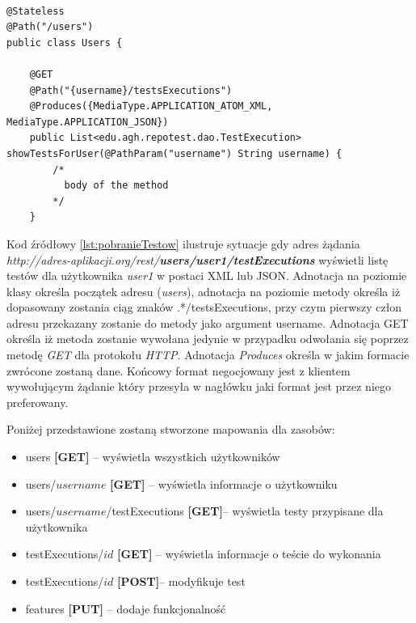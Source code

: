   
 \begin{lstlisting}[caption=Pobranie testów do wykonania dla użytkownika,label=lst:pobranieTestow]

@Stateless
@Path("/users")
public class Users {

    @GET
    @Path("{username}/testsExecutions")
    @Produces({MediaType.APPLICATION_ATOM_XML, MediaType.APPLICATION_JSON})
    public List<edu.agh.repotest.dao.TestExecution> showTestsForUser(@PathParam("username") String username) {
        /*
          body of the method
        */
    }

\end{lstlisting}
 
 Kod źródłowy \ref{lst:pobranieTestow} ilustruje sytuacje gdy adres żądania \textit{http://adres-aplikacji.org/rest/\textbf{users/user1/testExecutions}} wyświetli listę testów dla użytkownika \textit{user1} w postaci XML lub JSON. Adnotacja na poziomie klasy określa początek adresu (\textit{users}), adnotacja na poziomie metody określa iż dopasowany zostania ciąg znaków .*/testsExecutions, przy czym pierwszy człon adresu przekazany zostanie do metody jako argument username. Adnotacja GET określa iż metoda zostanie wywołana jedynie w przypadku odwołania się poprzez metodę \textit{GET} dla protokołu \textit{HTTP}. Adnotacja \textit{Produces} określa w jakim formacie zwrócone zostaną dane. Końcowy format negocjowany jest z klientem wywołującym żądanie który przesyła w nagłówku jaki format jest przez niego preferowany.
 
Poniżej przedstawione zostaną stworzone mapowania dla zasobów:
\begin{itemize}
  \item users \textbf{[GET]} -- wyświetla wszystkich użytkowników
  \item users/{$username$} \textbf{[GET]} -- wyświetla informacje o użytkowniku
  \item users/{$username$}/testExecutions \textbf{[GET]}-- wyświetla testy przypisane dla użytkownika
  \item testExecutions/{$id$} \textbf{[GET]} -- wyświetla informacje o teście do wykonania
  \item testExecutions/{$id$} \textbf{[POST]}-- modyfikuje test
  \item features \textbf{[PUT]} -- dodaje funkcjonalność
  
\end{itemize}


